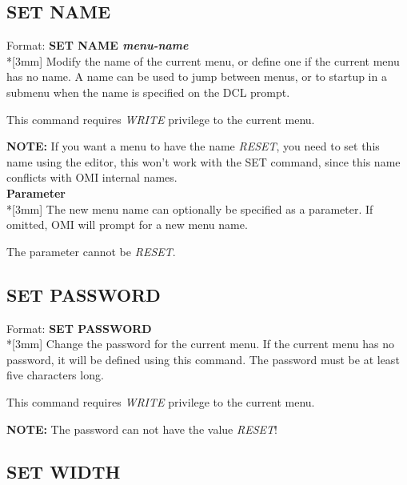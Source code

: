 \documentclass[a4paper]{book}
\newcommand{\vs}{\vspace{3mm}}
\renewcommand{\indent}{\hspace*{5mm}}
\begin{document}
\subsection{SET NAME}
\label{subsubsec:mylabel77}

\indent Format: \textbf{SET NAME \textit{menu-name}}\dag\\*[3mm]
Modify the name of the current menu, or define one if the current menu has 
no name. A name can be used to jump between menus, or to startup in a 
submenu when the name is specified on the DCL prompt.

This command requires \textsl{WRITE} privilege to the current menu.

\vs

\hspace{-8mm}\textbf{NOTE:} If you want a menu to have the name \textsl{RESET}, you need to set 
this name using the editor, this won't work with the \textsf{SET} command, since this 
name conflicts with OMI internal names.\\[3mm]
\textbf{Parameter}\\*[3mm]
The new menu name can optionally be specified as a parameter. If omitted, 
OMI will prompt for a new menu name.

The parameter cannot be \textsl{RESET}.

\subsection{SET PASSWORD}
\label{subsubsec:mylabel78}

\indent Format: \textbf{SET PASSWORD}\dag \\*[3mm]
Change the password for the current menu. If the current menu has no 
password, it will be defined using this command. The password must be at 
least five characters long.

This command requires \textsl{WRITE} privilege to the current menu.

\vs

\hspace{-8mm}\textbf{NOTE:} The password can not have the value \textsl{RESET}!

\subsection{SET WIDTH}
\label{subsubsec:mylabel79}
\end{document}
